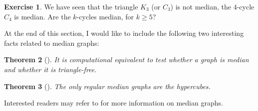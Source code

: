 \documentclass[12pt, a4paper]{article}
\theoremstyle{plain}
\newtheorem{theorem}{Theorem}[section]
\theoremstyle{definition}
\newtheorem{exercise}[theorem]{Exercise}
\theoremstyle{remark}
\begin{document}
    \begin{exercise}
        We have seen that the triangle $K_{3}$ (or $C_{3}$) is not median, the $4$-cycle $C_{4}$ is median. Are the $k$-cycles median, for $k \geq 5$?
    \end{exercise}
    
    At the end of this section, I would like to include the following two interesting facts related to median graphs:
    
    \begin{theorem}[\cite{imrich}]
        It is computational equivalent to test whether a graph is median and whether it is triangle-free.
    \end{theorem}
    
    \begin{theorem}[\cite{mulder}]
        The only regular median graphs are the hypercubes.
    \end{theorem}
    
    Interested readers may refer to \cite{survey} for more information on median graphs.
    
    \nocite{*}
    
    
    
\end{document}
